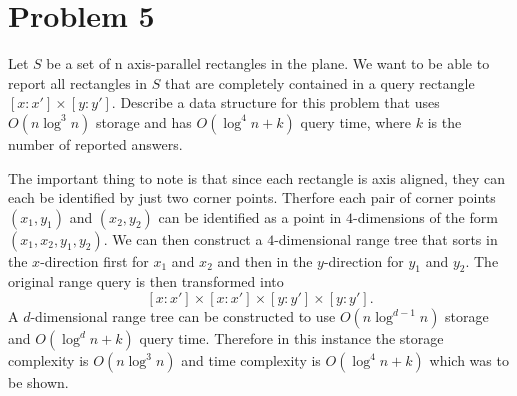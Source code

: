 \documentclass[12pt]{extarticle}
\begin{document}
\section*{Problem 5}
Let $S$ be a set of n axis-parallel rectangles in the plane. We want to be able to report all rectangles in $S$ that are completely contained in a query rectangle $[x : x']\times [y : y']$. Describe a data structure for this problem that uses $O(n \log^3 n)$ storage and has $O(\log^4 n + k)$ query time, where $k$ is the number of reported answers.

\begin{solution}
    The important thing to note is that since each rectangle is axis aligned, they can each be identified by just two corner points. Therfore each pair of corner points $(x_1, y_1)$ and $(x_2, y_2)$ can be identified as a point in $4$-dimensions of the form $(x_1, x_2, y_1, y_2)$. We can then construct a $4$-dimensional range tree that sorts in the $x$-direction first for $x_1$ and $x_2$ and then in the $y$-direction for $y_1$ and $y_2$. The original range query is then transformed into
    \[
        [x : x'] \times [x : x'] \times [y : y'] \times [y : y']
    .\]
    A $d$-dimensional range tree can be constructed to use $O(n \log^{d-1} n)$ storage and $O(\log^d n + k)$ query time. Therefore in this instance the storage complexity is $O(n \log^3 n)$ and time complexity is $O(\log^4 n + k)$ which was to be shown.
\end{solution}
\end{document}
